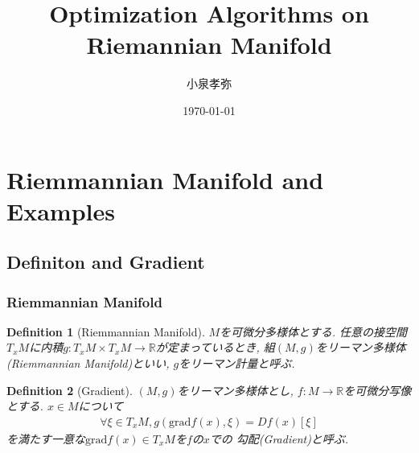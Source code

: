 \documentclass[dvipdfmx,11pt]{beamer}		%
\title{Optimization Algorithms on Riemannian Manifold}
\author{小泉孝弥}
\institute{立命館大学大学院 修士2年}
\date{\today}
\newtheorem{defi}{Definition}
\newcommand{\R}{\mathbb{R}}
\newcommand{\tpm}{T_xM}
\begin{document}
    \begin{frame}\frametitle{}
        \titlepage
    \end{frame}

    \section{Riemmannian Manifold and Examples}
    \subsection{Definiton and Gradient}
    \begin{frame}\frametitle{Riemmannian Manifold}
        \begin{defi}[Riemmannian Manifold]
            $M$を可微分多様体とする. 任意の接空間$\tpm$に内積$g : \tpm\times\tpm\to\R$が定まっているとき, 
            組$(M, g)$をリーマン多様体(Riemmannian Manifold)といい, $g$をリーマン計量と呼ぶ.
        \end{defi}
        \begin{defi}[Gradient]
            $(M, g)$をリーマン多様体とし, $f:M\to\R$を可微分写像とする. $x\in M$について
            \begin{align*}
                \forall\xi\in\tpm, g(\mathrm{grad}f(x), \xi) = Df(x)[\xi]
            \end{align*}
            を満たす一意な$\mathrm{grad}f(x)\in\tpm$を$f$の$x$での
            勾配(Gradient)と呼ぶ.
        \end{defi}
    \end{frame}
\end{document}
